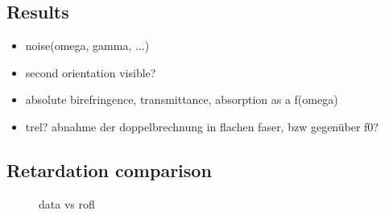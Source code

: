 \subsection{Results}
% 
\begin{itemize}
\item noise(omega, gamma, ...)
\item second orientation visible?
\item absolute birefringence, transmittance, absorption as a f(omega)
\item trel? abnahme der doppelbrechnung in flachen faser, bzw gegenüber f0?
\end{itemize}
% 
% 
% 
\subsection{Retardation comparison}
% 
\begin{figure}[!t]
\centering
{}
\caption[data vs rofl]{data vs rofl}
\label{fig:sim_05_PM_Vervet_r_r}
\end{figure}
% 
% 
% 
% 
